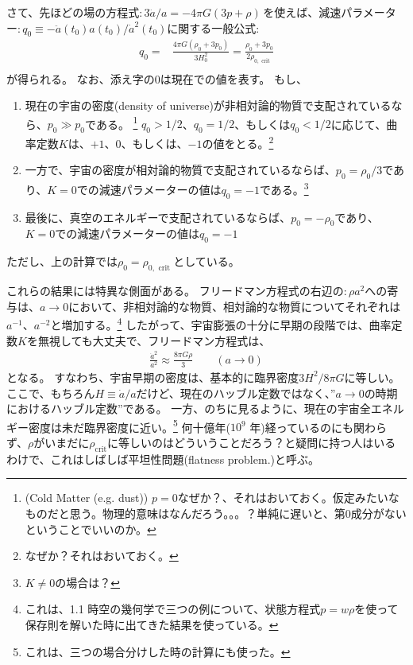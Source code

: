 \documentclass[11pt]{ltjsarticle}
\theoremstyle{plain}
\theoremstyle{break}
\begin{document}
さて、先ほどの場の方程式$:3\ddot{a}/{a}=-4 \pi G(3 p+\rho)\,$を使えば、減速パラメーター$:q_{0} \equiv-\ddot{a}\left(t_{0}\right) a\left(t_{0}\right) / \dot{a}^{2}\left(t_{0}\right)$に関する一般公式:
\begin{align}
  q_{0}
    =&\frac{4 \pi G\left(\rho_{0}+3 p_{0}\right)}{3 H_{0}^{2}}=\frac{\rho_{0}+3 p_{0}}{2 \rho_{0, \text { crit }}}  \\
\end{align}%
が得られる。
なお、添え字の$0$は現在での値を表す。
もし、
\begin{enumerate}
\item 現在の宇宙の密度(density of universe)が非相対論的物質で支配されているなら、$p_0 \gg p_0$である。 
\footnote{(Cold Matter (e.g. dust)) $p=0$なぜか？、それはおいておく。仮定みたいなものだと思う。物理的意味はなんだろう。。。？単純に遅いと、第0成分がないということでいいのか。}
$q_0 > 1/2$、$q_0 = 1/2$、もしくは$q_0 < 1/2$に応じて、曲率定数$K$は、$+1$、$0$、もしくは、$-1$の値をとる。\footnote{なぜか？それはおいておく。}

\item 一方で、宇宙の密度が相対論的物質で支配されているならば、$p_0 = \rho_0 /3$であり、$K=0$での減速パラメーターの値は$q_0 = -1$である。\footnote{$K \neq 0 $の場合は？}

\item 最後に、真空のエネルギーで支配されているならば、$p_0 = - \rho_0$であり、$K=0$での減速パラメーターの値は$q_0 =-1$
\end{enumerate}
ただし、上の計算では$\rho_0 = \rho_{0, \text{ crit }}$としている。

これらの結果には特異な側面がある。
フリードマン方程式の右辺の$:\rho a^2$への寄与は、$a \to 0$において、非相対論的な物質、相対論的な物質についてそれぞれは$a^{-1}$、$a^{-2}$と増加する。\footnote{これは、1.1 時空の幾何学で三つの例について、状態方程式$p=w \rho$を使って保存則を解いた時に出てきた結果を使っている。}
したがって、宇宙膨張の十分に早期の段階では、曲率定数$K$を無視しても大丈夫で、フリードマン方程式は、
\begin{align}
  \frac{\dot{a}^2}{a^2}  \approx \frac{8 \pi G \rho}{3} \qquad (a \to 0)
\end{align}%
となる。
すなわち、宇宙早期の密度は、基本的に臨界密度$3H^2/8\pi G$に等しい。
ここで、もちろん$H \equiv \dot{a} / a$だけど、現在のハッブル定数ではなく、”$a\to 0 $の時期におけるハッブル定数”である。
一方、のちに見るように、現在の宇宙全エネルギー密度は未だ臨界密度に近い。\footnote{これは、三つの場合分けした時の計算にも使った。}
何十億年($10^9$ 年)経っているのにも関わらず、$\rho$がいまだに$\rho_{\text{crit}}$に等しいのはどういうことだろう？と疑問に持つ人はいるわけで、これはしばしば平坦性問題(flatness problem.)と呼ぶ。
\end{document}
